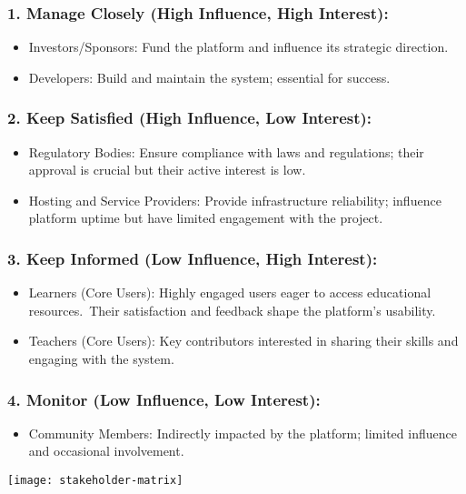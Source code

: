 \subsubsection*{1. Manage Closely (High Influence, High Interest):}
\begin{itemize}
\item Investors/Sponsors: Fund the platform and influence its strategic direction.
\item Developers: Build and maintain the system; essential for success.
\end{itemize}

\subsubsection*{2. Keep Satisfied (High Influence, Low Interest):}
\begin{itemize}
\item Regulatory Bodies: Ensure compliance with laws and regulations; their approval is crucial but their active interest is low.
\item Hosting and Service Providers: Provide infrastructure reliability; influence platform uptime but have limited engagement with the project.
\end{itemize}

\subsubsection*{3. Keep Informed (Low Influence, High Interest):}
\begin{itemize}
\item Learners (Core Users): Highly engaged users eager to access educational resources.\ Their satisfaction and feedback shape the platform’s usability.
\item Teachers (Core Users): Key contributors interested in sharing their skills and engaging with the system.
\end{itemize}

\subsubsection*{4. Monitor (Low Influence, Low Interest):}
\begin{itemize}
\item Community Members: Indirectly impacted by the platform; limited influence and occasional involvement.
\end{itemize}

\texttt{[image: stakeholder-matrix]}